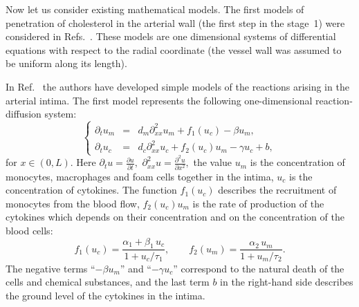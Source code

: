 \documentclass[reqno]{amsart}            %
\numberwithin{equation}{section}
\begin{document}
Now let us consider existing mathematical models.
The first models of penetration of cholesterol in the arterial wall (the first step in the stage~1) were considered in Refs.~\cite{BraColSmith,many1990}.
These models are one dimensional systems of differential equations with respect to the radial coordinate
(the vessel wall was assumed to be uniform along its length).

In Ref.~\cite{KhaGenKazVol-07} the authors have developed  simple models of the reactions arising in the arterial intima.
 The first model represents the following one-dimensional reaction-diffusion system:
\begin{equation}\label{sys1}
\left\{
    \begin{array}{rcl}
\partial_{t}u_m  &=& d_m \partial^2_{xx} u_m + f_1(u_c) - \beta u_m,
                                        \\[2mm]
\partial_{t}u_c  &=& d_c \partial^2_{xx} u_c + f_2(u_c) u_m  - \gamma u_c + b,
\end{array}
\right.
\end{equation}
for $x \in (0, L).$  Here $\partial_{t}u = \frac{\partial u}{\partial t},$  $\partial^2_{xx}u = \frac{\partial^2 u}{\partial x^2},$
the value $u_m$ is  the concentration of monocytes, macrophages and foam cells together  in the intima, $u_c$ is the concentration of cytokines.
The function $f_1(u_c)$  describes the recruitment of monocytes from the blood flow, $f_2(u_c) u_m$ is the rate of production of the cytokines
which depends on their concentration and on the concentration of the blood cells:
\begin{equation}\label{fun1}
f_1(u_c) = \frac{\alpha_1 + \beta_1\, u_c}{1 + u_c/ \tau_1}, \qquad  f_2(u_m) = \frac{ \alpha_2\, u_m}{1 + u_m / \tau_2}.
\end{equation}
The negative terms ``$- \beta u_m$'' and
``$- \gamma u_c$'' correspond to the natural death of the cells and chemical substances, and
the last term $b$ in the right-hand side describes the ground level of the cytokines in the intima.
\end{document}
